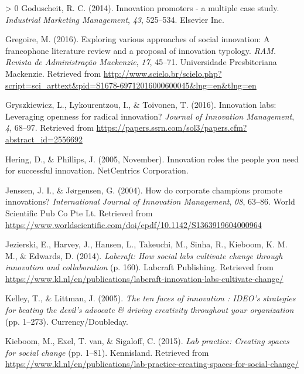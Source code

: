 \documentclass[]{elsarticle} %
\newlength{\cslhangindent}
\newenvironment{CSLReferences}[3] %
 {%
  \setlength{\parindent}{0pt}
  \ifodd #1 \everypar{\setlength{\hangindent}{\cslhangindent}}\ignorespaces\fi
  \ifnum #2 > 0
  \setlength{\parskip}{#2\baselineskip}
  \fi
 }%
 {}
\begin{document}
\begin{CSLReferences}{1}{0}
\leavevmode\hypertarget{ref-Goduscheit2014}{}%
Goduscheit, R. C. (2014). Innovation promoters - a multiple case study.
\emph{Industrial Marketing Management}, \emph{43}, 525--534. Elsevier
Inc.

\leavevmode\hypertarget{ref-Gregoire2016}{}%
Gregoire, M. (2016). Exploring various approaches of social innovation:
A francophone literature review and a proposal of innovation typology.
\emph{RAM. Revista de Administração Mackenzie}, \emph{17}, 45--71.
Universidade Presbiteriana Mackenzie. Retrieved from
\url{http://www.scielo.br/scielo.php?script=sci_arttext\&pid=S1678-69712016000600045\&lng=en\&tlng=en}

\leavevmode\hypertarget{ref-Gryszkiewicz2016}{}%
Gryszkiewicz, L., Lykourentzou, I., \& Toivonen, T. (2016). Innovation
labs: Leveraging openness for radical innovation? \emph{Journal of
Innovation Management}, \emph{4}, 68--97. Retrieved from
\url{https://papers.ssrn.com/sol3/papers.cfm?abstract_id=2556692}

\leavevmode\hypertarget{ref-Hering2005}{}%
Hering, D., \& Phillips, J. (2005, November). Innovation roles the
people you need for successful innovation. NetCentrics Corporation.

\leavevmode\hypertarget{ref-Jenssen2004}{}%
Jenssen, J. I., \& Jørgensen, G. (2004). How do corporate champions
promote innovations? \emph{International Journal of Innovation
Management}, \emph{08}, 63--86. World Scientific Pub Co Pte Lt.
Retrieved from
\url{https://www.worldscientific.com/doi/epdf/10.1142/S1363919604000964}

\leavevmode\hypertarget{ref-Jezierski2014}{}%
Jezierski, E., Harvey, J., Hansen, L., Takeuchi, M., Sinha, R., Kieboom,
K. M. M., \& Edwards, D. (2014). \emph{Labcraft: How social labs
cultivate change through innovation and collaboration} (p. 160).
Labcraft Publishing. Retrieved from
\url{https://www.kl.nl/en/publications/labcraft-innovation-labs-cultivate-change/}

\leavevmode\hypertarget{ref-Kelley2005}{}%
Kelley, T., \& Littman, J. (2005). \emph{The ten faces of innovation :
IDEO's strategies for beating the devil's advocate \& driving creativity
throughout your organization} (pp. 1--273). Currency/Doubleday.

\leavevmode\hypertarget{ref-Kieboom2015}{}%
Kieboom, M., Exel, T. van, \& Sigaloff, C. (2015). \emph{Lab practice:
Creating spaces for social change} (pp. 1--81). Kennisland. Retrieved
from
\url{https://www.kl.nl/en/publications/lab-practice-creating-spaces-for-social-change/}


\end{CSLReferences}
\end{document}
